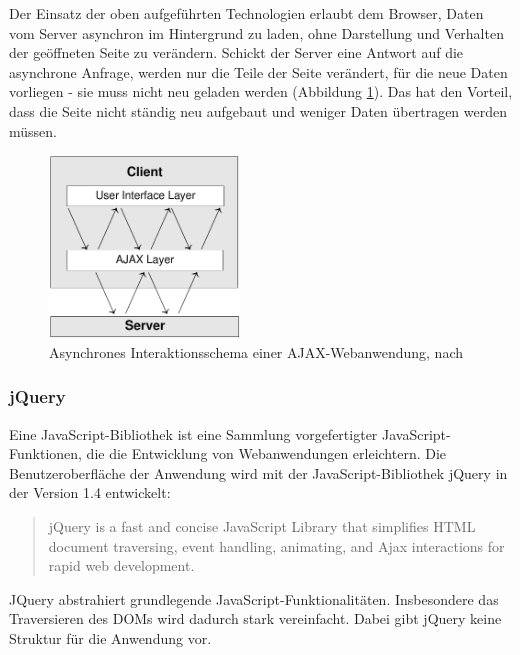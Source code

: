 Der Einsatz der oben aufgeführten Technologien erlaubt dem Browser, Daten vom Server asynchron im Hintergrund zu laden, ohne Darstellung und Verhalten der geöffneten Seite zu verändern. Schickt der Server eine Antwort auf die asynchrone Anfrage, werden nur die Teile der Seite verändert, für die neue Daten vorliegen - sie muss nicht neu geladen werden (Abbildung \ref{fig:ajax-interaction-pattern}). Das hat den Vorteil, dass die Seite nicht ständig neu aufgebaut und weniger Daten übertragen werden müssen.

\medskip
\begin{figure}[ht] 
 \begin{center}
   \includegraphics[width=0.45\textwidth]{grafik/ajax-ajax} 
 \end{center}
 \caption[Asynchrones Interaktionsschema einer AJAX-Webanwendung]{Asynchrones Interaktionsschema einer AJAX-Webanwendung, nach }
 \label{fig:ajax-interaction-pattern} 
\end{figure}



\subsubsection{jQuery}

Eine JavaScript-Bibliothek ist eine Sammlung vorgefertigter JavaScript-Funktionen, die die Entwicklung von Webanwendungen erleichtern. Die Benutzeroberfläche der Anwendung wird mit der JavaScript-Bibliothek jQuery \cite{jquery:homepage} in der Version 1.4 entwickelt:

\begin{quote}
jQuery is a fast and concise JavaScript Library that simplifies HTML document traversing, event handling, animating, and Ajax interactions for rapid web development. \cite{jquery:homepage}
\end{quote}

JQuery abstrahiert grundlegende JavaScript-Funktionalitäten. Insbesondere das Traversieren des DOMs wird dadurch stark vereinfacht. Dabei gibt jQuery keine Struktur für die Anwendung vor.

